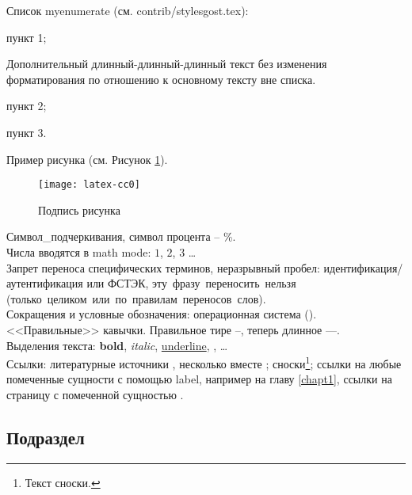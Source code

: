 Список myenumerate (см. contrib/stylesgost.tex):
\begin{myenumerate}
\item пункт 1;

  Дополнительный длинный-длинный-длинный текст без изменения
  форматирования по отношению к основному тексту вне списка.

\item пункт 2;
\item пункт 3. \\
\end{myenumerate}

Пример рисунка (см. Рисунок \ref{test1}). \\

\begin{figure}[bhtp]
  \centering \texttt{[image: latex-cc0]}
  \caption{Подпись рисунка} \label{test1}
\end{figure}

Символ\_подчеркивания, символ процента -- \%. \\

Числа вводятся в math mode: $1$, $2$, $3$ \dots{} \\

Запрет переноса специфических терминов, неразрывный пробел:
\mbox{идентификация/аутентификация} или \mbox{ФСТЭК},
эту~фразу~переносить~нельзя
(только~целиком~или~по~правилам~переносов~слов). \\

Сокращения и условные обозначения: операционная система
(). \\

<<Правильные>> кавычки. Правильное тире --, теперь длинное ---. \\

Выделения текста: \textbf{bold}, \textit{italic},
\underline{underline}, , \dots{} \\

Ссылки: литературные источники \cite{article_other}, несколько вместе
\cite{article_pub, article_vak, article_scopus, book1, thesis1,
  conference1, hyperlink1}; сноски\footnote{Текст сноски.}; ссылки на
любые помеченные сущности с помощью label, например на главу
\ref{chapt1}, ссылки на страницу с помеченной сущностью
\pageref{chapt1}. \\

\subsection{Подраздел} \label{subsect1_1_1}

